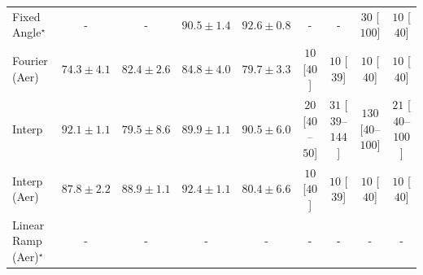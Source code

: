 \begin{tabular}{l|cccc|cccc|}
Fixed Angle$^\star$ & {\cellcolor[HTML]{000000}} \color[HTML]{F1F1F1} {\cellcolor{white}} \color{black} - & {\cellcolor[HTML]{000000}} \color[HTML]{F1F1F1} {\cellcolor{white}} \color{black} - & {\cellcolor[HTML]{963304}} \color[HTML]{F1F1F1} $90.5\pm 1.4$ & {\cellcolor[HTML]{732905}} \color[HTML]{F1F1F1} $92.6\pm 0.8$ & {\cellcolor[HTML]{000000}} \color[HTML]{F1F1F1} {\cellcolor{white}} \color{black} - & {\cellcolor[HTML]{000000}} \color[HTML]{F1F1F1} {\cellcolor{white}} \color{black} - & {\cellcolor[HTML]{FFF3EF}} \color[HTML]{000000} $30$ [$100$] & {\cellcolor[HTML]{FFF7F3}} \color[HTML]{000000} $10$ [$40$] \\
Fourier (Aer) & {\cellcolor[HTML]{FEE89B}} \color[HTML]{000000} $74.3\pm 4.1$ & {\cellcolor[HTML]{F68820}} \color[HTML]{F1F1F1} $82.4\pm 2.6$ & {\cellcolor[HTML]{E56910}} \color[HTML]{F1F1F1} $84.8\pm 4.0$ & {\cellcolor[HTML]{FEAE3B}} \color[HTML]{000000} $79.7\pm 3.3$ & {\cellcolor[HTML]{FFF7F3}} \color[HTML]{000000} $10$ [$40$] & {\cellcolor[HTML]{FFF7F3}} \color[HTML]{000000} $10$ [$39$] & {\cellcolor[HTML]{FFF7F3}} \color[HTML]{000000} $10$ [$40$] & {\cellcolor[HTML]{FFF7F3}} \color[HTML]{000000} $10$ [$40$] \\
Interp & {\cellcolor[HTML]{7B2B05}} \color[HTML]{F1F1F1} $92.1\pm 1.1$ & {\cellcolor[HTML]{FEB13E}} \color[HTML]{000000} $79.5\pm 8.6$ & {\cellcolor[HTML]{A03704}} \color[HTML]{F1F1F1} $89.9\pm 1.1$ & {\cellcolor[HTML]{963304}} \color[HTML]{F1F1F1} $90.5\pm 6.0$ & {\cellcolor[HTML]{FFF5F1}} \color[HTML]{000000} $20$ [$40$--$50$] & {\cellcolor[HTML]{FFF3EF}} \color[HTML]{000000} $31$ [$39$--$144$] & {\cellcolor[HTML]{FDDBD7}} \color[HTML]{000000} $130$ [$40$--$100$] & {\cellcolor[HTML]{FFF5F1}} \color[HTML]{000000} $21$ [$40$--$100$] \\
Interp (Aer) & {\cellcolor[HTML]{C34802}} \color[HTML]{F1F1F1} $87.8\pm 2.2$ & {\cellcolor[HTML]{B13F03}} \color[HTML]{F1F1F1} $88.9\pm 1.1$ & {\cellcolor[HTML]{762A05}} \color[HTML]{F1F1F1} $92.4\pm 1.1$ & {\cellcolor[HTML]{FEA332}} \color[HTML]{000000} $80.4\pm 6.6$ & {\cellcolor[HTML]{FFF7F3}} \color[HTML]{000000} $10$ [$40$] & {\cellcolor[HTML]{FFF7F3}} \color[HTML]{000000} $10$ [$39$] & {\cellcolor[HTML]{FFF7F3}} \color[HTML]{000000} $10$ [$40$] & {\cellcolor[HTML]{FFF7F3}} \color[HTML]{000000} $10$ [$40$] \\
Linear Ramp (Aer)$^\star$ & {\cellcolor[HTML]{000000}} \color[HTML]{F1F1F1} {\cellcolor{white}} \color{black} - & {\cellcolor[HTML]{000000}} \color[HTML]{F1F1F1} {\cellcolor{white}} \color{black} - & {\cellcolor[HTML]{000000}} \color[HTML]{F1F1F1} {\cellcolor{white}} \color{black} - & {\cellcolor[HTML]{000000}} \color[HTML]{F1F1F1} {\cellcolor{white}} \color{black} - & {\cellcolor[HTML]{000000}} \color[HTML]{F1F1F1} {\cellcolor{white}} \color{black} - & {\cellcolor[HTML]{000000}} \color[HTML]{F1F1F1} {\cellcolor{white}} \color{black} - & {\cellcolor[HTML]{000000}} \color[HTML]{F1F1F1} {\cellcolor{white}} \color{black} - & {\cellcolor[HTML]{000000}} \color[HTML]{F1F1F1} {\cellcolor{white}} \color{black} - \\

\end{tabular}
